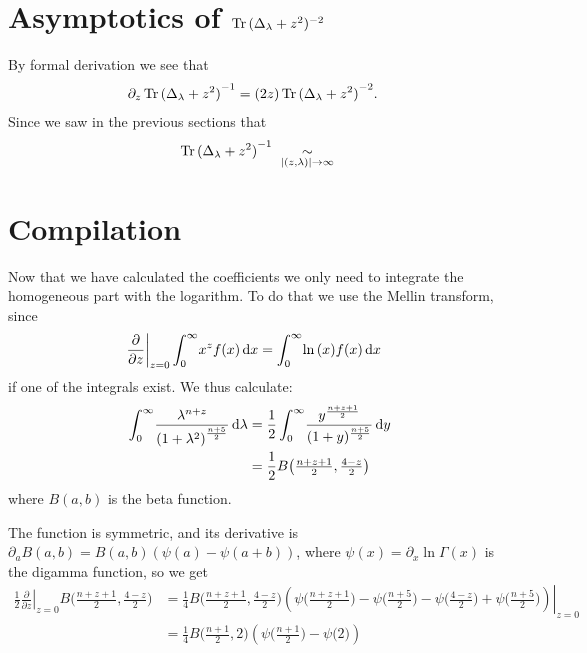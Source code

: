 \section{Asymptotics of $\Tr{(\Delta_\lambda + z^2)^{-2}}$}
By formal derivation we see that
\begin{align*}
    \partial_z\Tr{(\Delta_\lambda + z^2)}^{-1} &=
        (2z) \Tr{(\Delta_\lambda + z^2)}^{-2}.
\end{align*}
Since we saw in the previous sections that
\begin{align*}
    \Tr{(\Delta_\lambda + z^2)}^{-1}
    \ \SimAs{\Abs{(z,\lambda)}\to\infty}\ 
\end{align*}

\section{Compilation}
Now that we have calculated the coefficients we only need to integrate the
homogeneous part with the logarithm. To do that we use the Mellin transform,
since
\begin{align*}
    \left.\frac\partial{\partial z}\right|_{z=0}\Integ[\infty]{0}{x}{x^z f(x)}
    &= \Integ[\infty]{0}{x}{\ln{(x)} f(x)}
\end{align*}
if one of the integrals exist. We thus calculate:
\begin{align*}
    \Integ[\infty]{0}{\lambda}{\frac{\lambda^{n + z}}{\left(1 +
    \lambda^2\right)^{\frac{n+5}{2}}}} &=
    \frac12\Integ[\infty]{0}{y}{\frac{y^{\frac{n+z+1}{2}}}{(1 +
    y)^{\frac{n+5}{2}}}} \\
    &= \frac12 B\bigl(\tfrac{n+z+1}{2}, \tfrac{4-z}{2}\bigr)
\end{align*}
where $B(a,b)$ is the beta function. %

The function is symmetric, and its
derivative is $\partial_a B(a,b) = B(a,b) (\psi(a) - \psi(a+b))$, where
$\psi(x) = \partial_x \ln\Gamma(x)$ is the digamma function, so we get
\begin{align*}
    \left.\frac12\frac\partial{\partial z}\right|_{z=0} B\bigl(\tfrac{n+z+1}{2},
    \tfrac{4-z}{2}\bigr)
    &= \left.\frac14 B\bigl(\tfrac{n+z+1}{2}, \tfrac{4-z}{2}\bigr)
    \left(\psi\bigl(\tfrac{n+z+1}{2}\bigr) - \psi\bigl(\tfrac{n+5}{2}\bigr) -
    \psi\bigl(\tfrac{4-z}{2}\bigr) +
    \psi\bigl(\tfrac{n+5}{2}\bigr)\right)\right|_{z=0} \\
    &= \frac14 B\bigl(\tfrac{n+1}{2}, 2\bigr)
    \left(\psi\bigl(\tfrac{n+1}{2}\bigr) - \psi\bigl(2\bigr)\right)
\end{align*}

